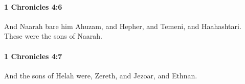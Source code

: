 		\paragraph{1 Chronicles 4:6} %
			\label{1CHRONICLES-4-6}

			And Naarah bare him Ahuzam, and Hepher, and Temeni, and Haahashtari. These were the sons of Naarah.


		\paragraph{1 Chronicles 4:7} %
			\label{1CHRONICLES-4-7}

			And the sons of Helah were, Zereth, and Jezoar, and Ethnan.


